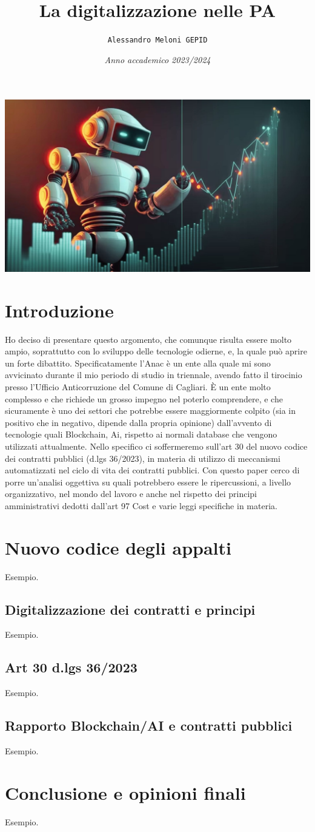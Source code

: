 \documentclass{article}
\title{\textbf{La digitalizzazione nelle PA}}
\author{\texttt{Alessandro Meloni GEPID}}
\date{\textit{Anno accademico 2023/2024}}
\begin{document}
\maketitle
    \includegraphics[width = 0.9\linewidth]{Img.jpg}
\centering \tableofcontents
\newpage\centering
\section{Introduzione}
\flushleft \begin{justify}
Ho deciso di presentare questo argomento, che comunque risulta essere molto ampio, soprattutto con lo sviluppo delle tecnologie odierne, e, la quale può aprire un forte dibattito. Specificatamente l'Anac è un ente alla quale mi sono avvicinato durante il mio periodo di studio in triennale, avendo fatto il tirocinio presso l'Ufficio Anticorruzione del Comune di Cagliari. È un ente molto complesso e che richiede un grosso impegno nel poterlo comprendere, e che sicuramente è uno dei settori che potrebbe essere maggiormente colpito (sia in positivo che in negativo, dipende dalla propria opinione) dall'avvento di tecnologie quali Blockchain, Ai, rispetto ai normali database che vengono utilizzati attualmente. Nello specifico ci soffermeremo sull'art 30 del nuovo codice dei contratti pubblici (d.lgs 36/2023), in materia di utilizzo di meccanismi automatizzati nel ciclo di vita dei contratti pubblici. Con questo paper cerco di porre un'analisi oggettiva su quali potrebbero essere le ripercussioni, a livello organizzativo, nel mondo del lavoro e anche nel rispetto dei principi amministrativi dedotti dall'art 97 Cost e varie leggi specifiche in materia.
\end{justify}

\newpage\centering
\section{Nuovo codice degli appalti}
\flushleft Esempio.

\flushleft \subsection{Digitalizzazione dei contratti e principi}
Esempio.
\flushleft \subsection{Art 30 d.lgs 36/2023}
Esempio.
\flushleft \subsection{Rapporto Blockchain/AI e contratti pubblici}
Esempio.

\newpage \centering
\section{Conclusione e opinioni finali}
\flushleft Esempio.
\end{document}
